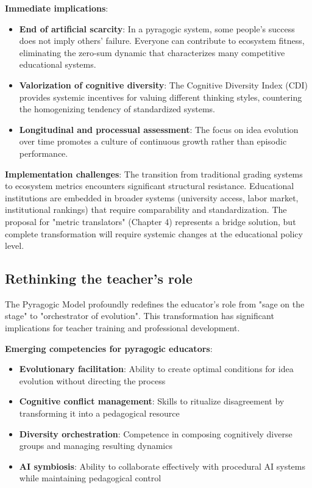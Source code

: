 \newpage

\textbf{Immediate implications}:
\begin{itemize}
	\item \textbf{End of artificial scarcity}: In a pyragogic system, some people's success does not imply others' failure. Everyone can contribute to ecosystem fitness, eliminating the zero-sum dynamic that characterizes many competitive educational systems.
	
	\item \textbf{Valorization of cognitive diversity}: The Cognitive Diversity Index (CDI) provides systemic incentives for valuing different thinking styles, countering the homogenizing tendency of standardized systems.
	
	\item \textbf{Longitudinal and processual assessment}: The focus on idea evolution over time promotes a culture of continuous growth rather than episodic performance.
\end{itemize}

\textbf{Implementation challenges}:
The transition from traditional grading systems to ecosystem metrics encounters significant structural resistance. Educational institutions are embedded in broader systems (university access, labor market, institutional rankings) that require comparability and standardization. The proposal for "metric translators" (Chapter 4) represents a bridge solution, but complete transformation will require systemic changes at the educational policy level.

\subsection{Rethinking the teacher's role}

The Pyragogic Model profoundly redefines the educator's role from "sage on the stage" to "orchestrator of evolution". This transformation has significant implications for teacher training and professional development.

\textbf{Emerging competencies for pyragogic educators}:
\begin{itemize}
	\item \textbf{Evolutionary facilitation}: Ability to create optimal conditions for idea evolution without directing the process
	\item \textbf{Cognitive conflict management}: Skills to ritualize disagreement by transforming it into a pedagogical resource
	\item \textbf{Diversity orchestration}: Competence in composing cognitively diverse groups and managing resulting dynamics
	\item \textbf{AI symbiosis}: Ability to collaborate effectively with procedural AI systems while maintaining pedagogical control
\end{itemize}


